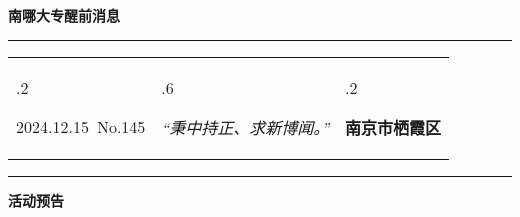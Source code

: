\documentclass[letterpaper, 12pt]{article}
\begin{document}
\begin{center}
    \Huge\textbf{南哪大专醒前消息}
\end{center}
\vspace{4mm}
\hrule
\renewcommand\tabularxcolumn[1]{m{#1}}
\begin{tabularx}{\textwidth}{>{\hsize.2\hsize}X>{\hsize.6\hsize}X>{\hsize.2\hsize}X}
    \begin{flushleft}
        2024.12.15\, No.145
    \end{flushleft}
    &
    \begin{center}
        \textit{“秉中持正、求新博闻。”}
    \end{center}
    &
    \begin{flushright}
        \textbf{南京市栖霞区}
    \end{flushright}
\end{tabularx}
\vspace{-3.5mm}
\hrule
\vspace{4mm}
\centerline{\huge\textbf{活动预告}}
\end{document}
